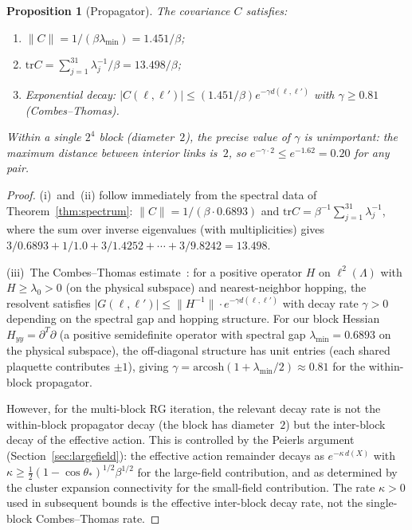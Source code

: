 \documentclass[11pt]{article}
\newtheorem{proposition}[theorem]{Proposition}
\theoremstyle{definition}
\newcommand{\tr}{\mathrm{tr}}
\begin{document}
\begin{proposition}[Propagator]\label{prop:propagator}
The covariance $C$ satisfies:
\begin{enumerate}[nosep,label=(\roman*)]
\item $\|C\|=1/(\beta\lambda_{\min})=1.451/\beta$;
\item $\tr C=\sum_{j=1}^{31}\lambda_j^{-1}/\beta=13.498/\beta$;
\item Exponential decay:
$|C(\ell,\ell')|\le(1.451/\beta)e^{-\gamma d(\ell,\ell')}$
with $\gamma\ge 0.81$ (Combes--Thomas).
\end{enumerate}
Within a single $2^4$ block (diameter~$2$), the precise value of
$\gamma$ is unimportant: the maximum distance between interior links
is~$2$, so $e^{-\gamma\cdot 2}\le e^{-1.62}=0.20$ for any pair.
\end{proposition}

\begin{proof}
(i)~and~(ii) follow immediately from the spectral data of
Theorem~\ref{thm:spectrum}: $\|C\|=1/(\beta\cdot 0.6893)$
and $\tr C=\beta^{-1}\sum_{j=1}^{31}\lambda_j^{-1}$, where the sum
over inverse eigenvalues (with multiplicities) gives
$3/0.6893+1/1.0+3/1.4252+\cdots+3/9.8242=13.498$.

(iii)~The Combes--Thomas estimate~\cite{CombesThomas}: for a positive
operator $H$ on $\ell^2(\Lambda)$ with $H\ge\lambda_0>0$ (on the
physical subspace) and nearest-neighbor hopping, the resolvent
satisfies $|G(\ell,\ell')|\le\|H^{-1}\|\cdot e^{-\gamma d(\ell,\ell')}$
with decay rate $\gamma>0$ depending on the spectral gap and hopping
structure.  For our block Hessian $H_{yy}=\partial^T\partial$ (a
positive semidefinite operator with spectral gap $\lambda_{\min}=0.6893$
on the physical subspace), the off-diagonal structure has unit entries
(each shared plaquette contributes $\pm 1$), giving
$\gamma=\mathrm{arcosh}(1+\lambda_{\min}/2)\approx 0.81$
for the within-block propagator.

However, for the multi-block RG iteration, the relevant decay rate is
not the within-block propagator decay (the block has diameter~$2$) but
the inter-block decay of the effective action.  This is controlled by
the Peierls argument (Section~\ref{sec:largefield}): the effective
action remainder decays as $e^{-\kappa\,d(X)}$ with
$\kappa\ge\frac{1}{2}(1-\cos\theta_*)^{1/2}\beta^{1/2}$ for the
large-field contribution, and as determined by the cluster expansion
connectivity for the small-field contribution.  The rate
$\kappa>0$ used in subsequent bounds is the effective inter-block
decay rate, not the single-block Combes--Thomas rate.
\end{proof}
\end{document}
